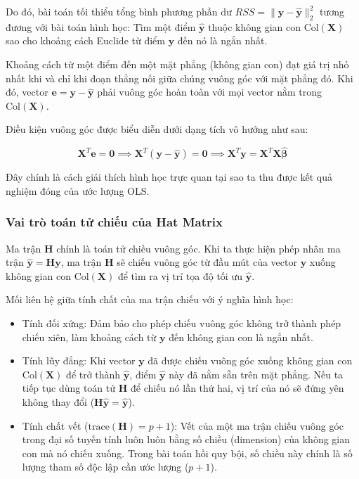 Do đó, bài toán tối thiểu tổng bình phương phần dư $RSS = \|\mathbf{y} - \hat{\mathbf{y}}\|_2^2$ tương đương với bài toán hình học: Tìm một điểm $\hat{\mathbf{y}}$ thuộc không gian con $\text{Col}(\mathbf{X})$ sao cho khoảng cách Euclide từ điểm $\mathbf{y}$ đến nó là ngắn nhất.

Khoảng cách từ một điểm đến một mặt phẳng (không gian con) đạt giá trị nhỏ nhất khi và chỉ khi đoạn thẳng nối giữa chúng vuông góc với mặt phẳng đó. Khi đó, vector $\mathbf{e} = \mathbf{y} - \hat{\mathbf{y}}$ phải vuông góc hoàn toàn với mọi vector nằm trong $\text{Col}(\mathbf{X})$.

Điều kiện vuông góc được biểu diễn dưới dạng tích vô hướng như sau:

\begin{equation}
    \mathbf{X}^T\mathbf{e} = \mathbf{0} \implies \mathbf{X}^T(\mathbf{y} - \hat{\mathbf{y}}) = \mathbf{0} \implies \mathbf{X}^T\mathbf{y} = \mathbf{X}^T\mathbf{X}\hat{\boldsymbol{\beta}}
\end{equation}

Đây chính là cách giải thích hình học trực quan tại sao ta thu được kết quả nghiệm đóng của ước lượng OLS.

\subsubsection{Vai trò toán tử chiếu của Hat Matrix}

Ma trận $\mathbf{H}$ chính là toán tử chiếu vuông góc. Khi ta thực hiện phép nhân ma trận $\hat{\mathbf{y}} = \mathbf{H}\mathbf{y}$, ma trận $\mathbf{H}$ sẽ chiếu vuông góc từ đầu mút của vector $\mathbf{y}$ xuống không gian con $\text{Col}(\mathbf{X})$ để tìm ra vị trí tọa độ tối ưu $\hat{\mathbf{y}}$.

Mối liên hệ giữa tính chất của ma trận chiếu với ý nghĩa hình học:

\begin{itemize}[topsep=0pt, itemsep=2.5pt, leftmargin=1.5cm]
    \item Tính đối xứng: Đảm bảo cho phép chiếu vuông góc không trở thành phép chiếu xiên, làm khoảng cách từ $\mathbf{y}$ đến không gian con là ngắn nhất.
    \item Tính lũy đẳng: Khi vector $\mathbf{y}$ đã được chiếu vuông góc xuống không gian con $\text{Col}(\mathbf{X})$ để trở thành $\hat{\mathbf{y}}$, điểm $\hat{\mathbf{y}}$ này đã nằm sẵn trên mặt phẳng. Nếu ta tiếp tục dùng toán tử $\mathbf{H}$ để chiếu nó lần thứ hai, vị trí của nó sẽ đứng yên không thay đổi ($\mathbf{H}\hat{\mathbf{y}} = \hat{\mathbf{y}}$).
    \item Tính chất vết ($\text{trace}(\mathbf{H}) = p + 1$): Vết của một ma trận chiếu vuông góc trong đại số tuyến tính luôn luôn bằng số chiều (dimension) của không gian con mà nó chiếu xuống. Trong bài toán hồi quy bội, số chiều này chính là số lượng tham số độc lập cần ước lượng ($p+1$).
\end{itemize}

